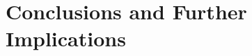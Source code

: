 %
%
%
%
%
%
%
%
%
%
%
%
%
%
%
%
%
%

\chapter{Conclusions and Further Implications}

\label{ch:conclusions}


